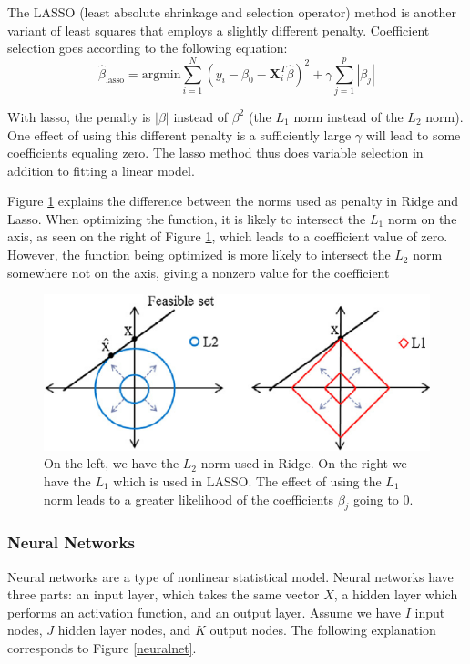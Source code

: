 \documentclass[12pt]{article}
\begin{document}
The LASSO (least absolute shrinkage and selection operator) method is another variant of least squares that employs a slightly different penalty. Coefficient selection goes according to the following equation:
$$\hat{\beta}_{\text{lasso}} = \text{argmin} \sum_{i=1}^{N} (y_i - \beta_0 - \textbf{X}_i^T \hat{\beta})^2 + \gamma \sum_{j=1}^{p}|\beta_j|$$

With lasso, the penalty is $|\beta|$ instead of $\beta^2$ (the $L_1$ norm instead of the $L_2$ norm). One effect of using this different penalty is a sufficiently large $\gamma$ will lead to some coefficients equaling zero. The lasso method thus does variable selection in addition to fitting a linear model. \cite[64]{springer}

Figure \ref{l2l1} explains the difference between the norms used as penalty in Ridge and Lasso. When optimizing the function, it is likely to intersect the $L_1$ norm on the axis, as seen on the right of Figure \ref{l2l1}, which leads to a coefficient value of zero. However, the function being optimized is more likely to intersect the $L_2$ norm somewhere not on the axis, giving a nonzero value for the coefficient

\begin{figure}
	\centering
	\includegraphics[width=.5\linewidth]{l2l1.png}
	\caption{On the left, we have the $L_2$ norm used in Ridge. On the right we have the $L_1$ which is used in LASSO. The effect of using the $L_1$ norm leads to a greater likelihood of the coefficients $\beta_j$ going to 0. }
	\label{l2l1}
\end{figure}

\subsubsection{Neural Networks}
Neural networks are a type of nonlinear statistical model. Neural networks have three parts: an input layer, which takes the same vector $X$, a hidden layer which performs an activation function, and an output layer. Assume we have $I$ input nodes, $J$ hidden layer nodes, and $K$ output nodes. The following explanation corresponds to Figure \ref{neuralnet}. 
\end{document}
